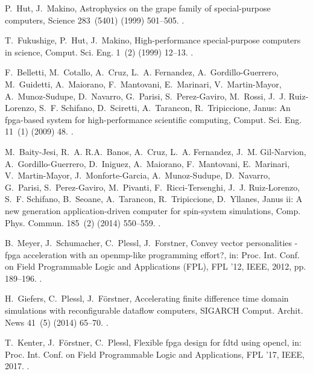 \documentclass[preprint]{elsarticle}
\begin{document}
\begin{thebibliography}{10}
P.~Hut, J.~Makino, Astrophysics on the grape family of special-purpose
  computers, Science 283~(5401) (1999) 501--505.
\newblock \href {https://doi.org/10.1126/science.283.5401.501}
  {}.

T.~Fukushige, P.~Hut, J.~Makino, High-performance special-purpose computers in
  science, Comput. Sci. Eng. 1~(2) (1999) 12--13.
\newblock \href {https://doi.org/10.1109/5992.753041}
  {}.

F.~Belletti, M.~Cotallo, A.~Cruz, L.~A. Fernandez, A.~Gordillo-Guerrero,
  M.~Guidetti, A.~Maiorano, F.~Mantovani, E.~Marinari, V.~Martin-Mayor,
  A.~Munoz-Sudupe, D.~Navarro, G.~Parisi, S.~Perez-Gaviro, M.~Rossi, J.~J.
  Ruiz-Lorenzo, S.~F. Schifano, D.~Sciretti, A.~Tarancon, R.~Tripiccione,
  Janus: An fpga-based system for high-performance scientific computing,
  Comput. Sci. Eng. 11~(1) (2009) 48.
\newblock \href {https://doi.org/10.1109/MCSE.2009.11}
  {}.

M.~Baity-Jesi, R.~A. R.A.~Banos, A.~Cruz, L.~A. Fernandez, J.~M. Gil-Narvion,
  A.~Gordillo-Guerrero, D.~Iniguez, A.~Maiorano, F.~Mantovani, E.~Marinari,
  V.~Martin-Mayor, J.~Monforte-Garcia, A.~Munoz-Sudupe, D.~Navarro, G.~Parisi,
  S.~Perez-Gaviro, M.~Pivanti, F.~Ricci-Tersenghi, J.~J. Ruiz-Lorenzo, S.~F.
  Schifano, B.~Seoane, A.~Tarancon, R.~Tripiccione, D.~Yllanes, Janus ii: A new
  generation application-driven computer for spin-system simulations, Comp.
  Phys. Commun. 185~(2) (2014) 550--559.
\newblock \href {https://doi.org/10.1016/j.cpc.2013.10.019}
  {}.

B.~Meyer, J.~Schumacher, C.~Plessl, J.~Forstner, Convey vector personalities -
  fpga acceleration with an openmp-like programming effort?, in: Proc. Int.
  Conf. on Field Programmable Logic and Applications (FPL), FPL '12, IEEE,
  2012, pp. 189--196.
\newblock \href {https://doi.org/10.1109/FPL.2012.6339259}
  {}.

H.~Giefers, C.~Plessl, J.~F\"{o}rstner, Accelerating finite difference time
  domain simulations with reconfigurable dataflow computers, SIGARCH Comput.
  Archit. News 41~(5) (2014) 65--70.
\newblock \href {https://doi.org/10.1145/2641361.2641372}
  {}.

T.~Kenter, J.~F\"orstner, C.~Plessl, Flexible fpga design for fdtd using
  opencl, in: Proc. Int. Conf. on Field Programmable Logic and Applications,
  FPL '17, IEEE, 2017.
\newblock \href {https://doi.org/10.23919/FPL.2017.8056844}
  {}.


\end{thebibliography}
\end{document}
